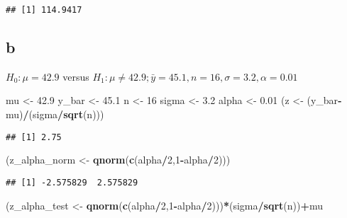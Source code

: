 \documentclass[]{article}
\newenvironment{Shaded}{\begin{snugshade}}{\end{snugshade}}
\newcommand{\KeywordTok}[1]{\textcolor[rgb]{0.13,0.29,0.53}{\textbf{#1}}}
\newcommand{\DecValTok}[1]{\textcolor[rgb]{0.00,0.00,0.81}{#1}}
\newcommand{\FloatTok}[1]{\textcolor[rgb]{0.00,0.00,0.81}{#1}}
\newcommand{\StringTok}[1]{\textcolor[rgb]{0.31,0.60,0.02}{#1}}
\newcommand{\OperatorTok}[1]{\textcolor[rgb]{0.81,0.36,0.00}{\textbf{#1}}}
\newcommand{\NormalTok}[1]{#1}
\begin{document}
\begin{verbatim}
## [1] 114.9417
\end{verbatim}

\subsection{b}\label{b}

\(H_0 : \mu=42.9\) versus
\(H_1 : \mu \ne 42.9 ; \bar{y}=45.1,n=16, \sigma =3.2, \alpha= 0.01\)

\begin{Shaded}
\begin{Highlighting}[]
\NormalTok{mu <-}\StringTok{ }\FloatTok{42.9}
\NormalTok{y_bar <-}\StringTok{ }\FloatTok{45.1}
\NormalTok{n <-}\StringTok{ }\DecValTok{16}
\NormalTok{sigma <-}\StringTok{ }\FloatTok{3.2}
\NormalTok{alpha <-}\StringTok{ }\FloatTok{0.01}
\NormalTok{(z <-}\StringTok{ }\NormalTok{(y_bar}\OperatorTok{-}\NormalTok{mu)}\OperatorTok{/}\NormalTok{(sigma}\OperatorTok{/}\KeywordTok{sqrt}\NormalTok{(n)))}
\end{Highlighting}
\end{Shaded}

\begin{verbatim}
## [1] 2.75
\end{verbatim}

\begin{Shaded}
\begin{Highlighting}[]
\NormalTok{(z_alpha_norm <-}\StringTok{ }\KeywordTok{qnorm}\NormalTok{(}\KeywordTok{c}\NormalTok{(alpha}\OperatorTok{/}\DecValTok{2}\NormalTok{,}\DecValTok{1}\OperatorTok{-}\NormalTok{alpha}\OperatorTok{/}\DecValTok{2}\NormalTok{)))}
\end{Highlighting}
\end{Shaded}

\begin{verbatim}
## [1] -2.575829  2.575829
\end{verbatim}

\begin{Shaded}
\begin{Highlighting}[]
\NormalTok{(z_alpha_test <-}\StringTok{ }\KeywordTok{qnorm}\NormalTok{(}\KeywordTok{c}\NormalTok{(alpha}\OperatorTok{/}\DecValTok{2}\NormalTok{,}\DecValTok{1}\OperatorTok{-}\NormalTok{alpha}\OperatorTok{/}\DecValTok{2}\NormalTok{)))}\OperatorTok{*}\NormalTok{(sigma}\OperatorTok{/}\KeywordTok{sqrt}\NormalTok{(n))}\OperatorTok{+}\NormalTok{mu}
\end{Highlighting}
\end{Shaded}
\end{document}
